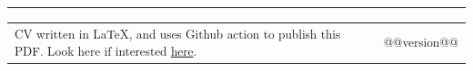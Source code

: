 \documentclass[10pt,a4paper]{article}
\makeatletter
\newcommand{\headerrow}[2]
{\begin{tabular*}{\linewidth}{l@{\extracolsep{\fill}}r}
	#1 &
	#2 \\
\end{tabular*}}
\makeatother
\begin{document}
\hrule
\vspace{-0.4em}

\begin{description*}
  	\item
  \headerrow
    {{\textsubscript{CV written in \LaTeX, and uses Github action to publish this PDF. Look here if interested \href{https://github.com/robert-will-brown/cv}{here}.}}}
    {{\textsubscript{@@version@@}}}

\end{description*}
\end{document}
